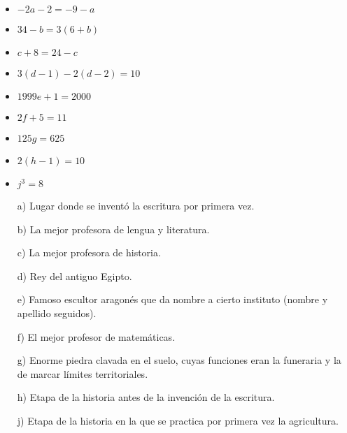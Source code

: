 \documentclass[a4paper]{article}
\begin{document}
\begin{itemize}
	\item $-2a-2=-9-a$
	\item $34-b = 3(6+b)$
	\item $c+8=24-c$
	\item $3(d-1)-2(d-2) = 10$
	\item $1999e + 1 = 2000$
	\item $2f+5=11$
	\item $125g=625$
	\item $2(h-1)=10$
	\item $j^3=8$
\end{itemize}
\newpage
\centering{}

\vspace{2cm}
\begin{itemize}
	\item[a)] Lugar donde se inventó la escritura por primera vez.
	\item[b)] La mejor profesora de lengua y literatura.
	\item[c)] La mejor profesora de historia.
	\item[d)] Rey del antiguo Egipto.
	\item[e)] Famoso escultor aragonés que da nombre a cierto instituto (nombre y apellido seguidos).
	\item[f)] El mejor profesor de matemáticas.
	\item[g)] Enorme piedra clavada en el suelo, cuyas funciones eran la funeraria y la de marcar límites territoriales.
	\item[h)] Etapa de la historia antes de la invención de la escritura.
	\item[j)] Etapa de la historia en la que se practica por primera vez la agricultura.
\end{itemize}
\end{document}
